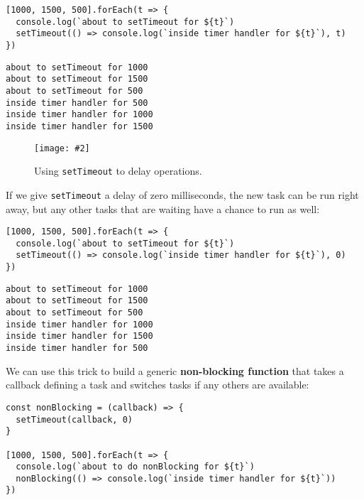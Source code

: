 \documentclass[krantzl]{krantz}
\newcommand{\figpdf}[4]{\begin{figure}%
\centering%
\texttt{[image: \#2]}%
\caption{#3}%
\label{#1}%
\end{figure}}
\newcommand{\glossref}[1]{\textbf{#1}}
\begin{document}
\begin{lstlisting}[frame=tblr]
[1000, 1500, 500].forEach(t => {
  console.log(`about to setTimeout for ${t}`)
  setTimeout(() => console.log(`inside timer handler for ${t}`), t)
})
\end{lstlisting}



\begin{lstlisting}[frame=tblr,backgroundcolor=\color{black!5}]
about to setTimeout for 1000
about to setTimeout for 1500
about to setTimeout for 500
inside timer handler for 500
inside timer handler for 1000
inside timer handler for 1500
\end{lstlisting}


\figpdf{async-programming-set-timeout}{./async-programming/set-timeout.pdf}{Using \texttt{setTimeout} to delay operations.}{0.6}


If we give \texttt{setTimeout} a delay of zero milliseconds,
the new task can be run right away,
but any other tasks that are waiting have a chance to run as well:


\begin{lstlisting}[frame=tblr]
[1000, 1500, 500].forEach(t => {
  console.log(`about to setTimeout for ${t}`)
  setTimeout(() => console.log(`inside timer handler for ${t}`), 0)
})
\end{lstlisting}



\begin{lstlisting}[frame=tblr,backgroundcolor=\color{black!5}]
about to setTimeout for 1000
about to setTimeout for 1500
about to setTimeout for 500
inside timer handler for 1000
inside timer handler for 1500
inside timer handler for 500
\end{lstlisting}



\noindent We can use this trick to build a generic
\glossref{non-blocking function}
that takes a callback defining a task
and switches tasks if any others are available:


\begin{lstlisting}[frame=tblr]
const nonBlocking = (callback) => {
  setTimeout(callback, 0)
}

[1000, 1500, 500].forEach(t => {
  console.log(`about to do nonBlocking for ${t}`)
  nonBlocking(() => console.log(`inside timer handler for ${t}`))
})
\end{lstlisting}
\end{document}
